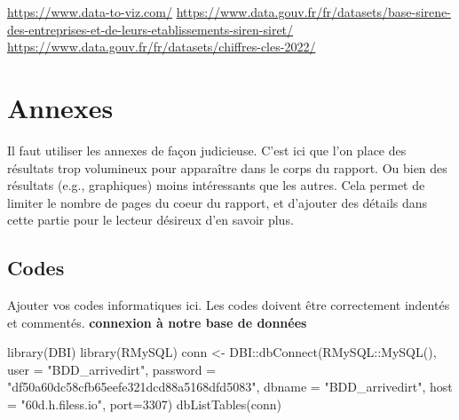 \documentclass[mstat,12pt]{unswthesis}
\newenvironment{Shaded}{\begin{snugshade}}{\end{snugshade}}
\newcommand{\AttributeTok}[1]{\textcolor[rgb]{0.77,0.63,0.00}{#1}}
\newcommand{\DecValTok}[1]{\textcolor[rgb]{0.00,0.00,0.81}{#1}}
\newcommand{\FunctionTok}[1]{\textcolor[rgb]{0.00,0.00,0.00}{#1}}
\newcommand{\NormalTok}[1]{#1}
\newcommand{\OtherTok}[1]{\textcolor[rgb]{0.56,0.35,0.01}{#1}}
\newcommand{\SpecialCharTok}[1]{\textcolor[rgb]{0.00,0.00,0.00}{#1}}
\newcommand{\StringTok}[1]{\textcolor[rgb]{0.31,0.60,0.02}{#1}}
\begin{document}
\leavevmode{}%
\begin{CSLReferences}{0}{0}
\url{https://www.data-to-viz.com/}
\url{https://www.data.gouv.fr/fr/datasets/base-sirene-des-entreprises-et-de-leurs-etablissements-siren-siret/}
\url{https://www.data.gouv.fr/fr/datasets/chiffres-cles-2022/}

\end{CSLReferences}




\hypertarget{annexes}{%
\chapter*{Annexes}\label{annexes}}

Il faut utiliser les annexes de façon judicieuse. C'est ici que l'on
place des résultats trop volumineux pour apparaître dans le corps du
rapport. Ou bien des résultats (e.g., graphiques) moins intéressants que
les autres. Cela permet de limiter le nombre de pages du coeur du
rapport, et d'ajouter des détails dans cette partie pour le lecteur
désireux d'en savoir plus.

\hypertarget{codes}{%
\section*{\texorpdfstring{\textbf{Codes}}{Codes}}\label{codes}}

Ajouter vos codes informatiques ici. Les codes doivent être correctement
indentés et commentés. \textbf{connexion à notre base de données}

\begin{Shaded}
\begin{Highlighting}[]
\FunctionTok{library}\NormalTok{(DBI)}
\FunctionTok{library}\NormalTok{(RMySQL)}
\NormalTok{conn }\OtherTok{\textless{}{-}}\NormalTok{ DBI}\SpecialCharTok{::}\FunctionTok{dbConnect}\NormalTok{(RMySQL}\SpecialCharTok{::}\FunctionTok{MySQL}\NormalTok{(), }
                  \AttributeTok{user =} \StringTok{"BDD\_arrivedirt"}\NormalTok{, }
                  \AttributeTok{password =} \StringTok{"df50a60dc58cfb65eefe321dcd88a5168dfd5083"}\NormalTok{, }
                  \AttributeTok{dbname =} \StringTok{"BDD\_arrivedirt"}\NormalTok{, }
                  \AttributeTok{host =} \StringTok{"60d.h.filess.io"}\NormalTok{,}
                \AttributeTok{port=}\DecValTok{3307}\NormalTok{)}
\FunctionTok{dbListTables}\NormalTok{(conn)}
\end{Highlighting}
\end{Shaded}
\end{document}
